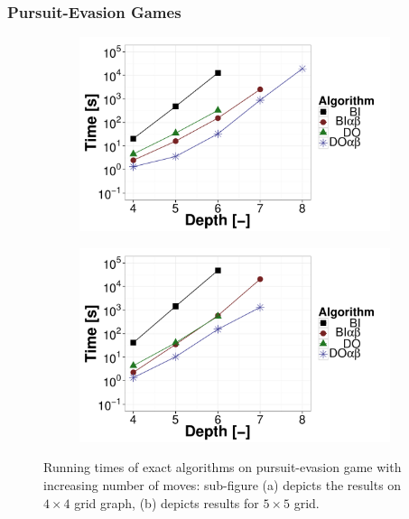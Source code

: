 \subsubsection{Pursuit-Evasion Games}
\begin{figure}
\centering
	\begin{subfigure}{0.49\textwidth}
		\includegraphics[width=1\textwidth]{figures/PEG4x4.pdf}\caption{}\label{fig:off:res:peg4}
	\end{subfigure}
	\begin{subfigure}{0.49\textwidth}
		\includegraphics[width=1\textwidth]{figures/PEG5x5.pdf}\caption{}\label{fig:off:res:peg5}
	\end{subfigure}
\caption{Running times of exact algorithms on pursuit-evasion game with increasing number of moves: sub-figure (a) depicts the results on $4\times4$ grid graph, (b) depicts results for $5\times5$ grid.} \label{fig:off:res:peg}
\end{figure}

